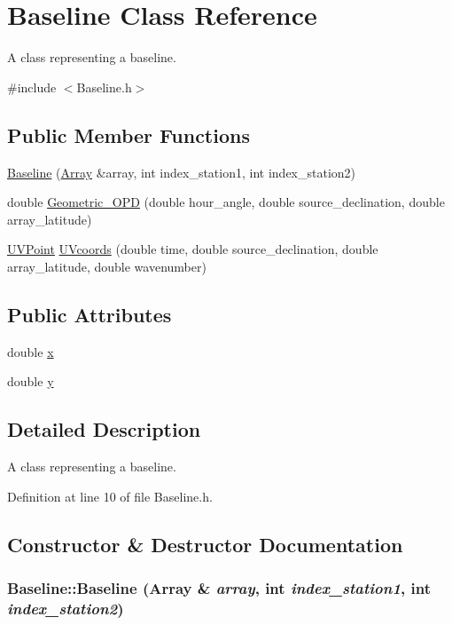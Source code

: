\hypertarget{classBaseline}{
\section{Baseline Class Reference}
\label{classBaseline}
}


A class representing a baseline.  




{\ttfamily \#include $<$Baseline.h$>$}

\subsection*{Public Member Functions}
\begin{DoxyCompactItemize}
\item 
\hyperlink{classBaseline_ad7df24f7615e0a456fb0f522c307e25e}{Baseline} (\hyperlink{classArray}{Array} \&array, int index\_\-station1, int index\_\-station2)
\item 
double \hyperlink{classBaseline_ae587b0cb5079c4fc80c51e057427cb8f}{Geometric\_\-OPD} (double hour\_\-angle, double source\_\-declination, double array\_\-latitude)
\item 
\hyperlink{classUVPoint}{UVPoint} \hyperlink{classBaseline_a30f26555e34ed66db0ac34a79da505bb}{UVcoords} (double time, double source\_\-declination, double array\_\-latitude, double wavenumber)
\end{DoxyCompactItemize}
\subsection*{Public Attributes}
\begin{DoxyCompactItemize}
\item 
double \hyperlink{classBaseline_a021810b132f5d98736d71b92b5f70e36}{x}
\item 
double \hyperlink{classBaseline_a2ffd76cdea353462b6529ec4e9b425b2}{y}
\end{DoxyCompactItemize}


\subsection{Detailed Description}
A class representing a baseline. 

Definition at line 10 of file Baseline.h.



\subsection{Constructor \& Destructor Documentation}
\hypertarget{classBaseline_ad7df24f7615e0a456fb0f522c307e25e}{
\subsubsection[{Baseline}]{\setlength{\rightskip}{0pt plus 5cm}Baseline::Baseline ({\bf Array} \& {\em array}, \/  int {\em index\_\-station1}, \/  int {\em index\_\-station2})}}
\label{classBaseline_ad7df24f7615e0a456fb0f522c307e25e}


